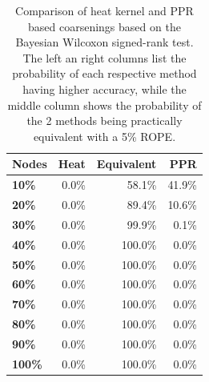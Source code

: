 \begin{table}
  \begin{center}
    \begin{minipage}{180pt} %
      \caption{Comparison of heat kernel and PPR based coarsenings based on the Bayesian Wilcoxon signed-rank test. The left an right columns list the probability of each respective method having higher accuracy, while the middle column shows the probability of the 2 methods being practically equivalent with a 5\% ROPE.}
      \label{tab:bayesian-heat-ppr}
      \begin{tabular}{lrrr}
        \toprule
        \textbf{Nodes} & \textbf{Heat} & \textbf{Equivalent} & \textbf{PPR} \\
        \midrule
        \textbf{10\%}  & 0.0\%         & 58.1\%            & 41.9\%         \\
        \textbf{20\%}  & 0.0\%         & 89.4\%            & 10.6\%         \\
        \textbf{30\%}  & 0.0\%         & 99.9\%            & 0.1\%         \\
        \textbf{40\%}  & 0.0\%         & 100.0\%           & 0.0\%          \\
        \textbf{50\%}  & 0.0\%         & 100.0\%           & 0.0\%          \\
        \textbf{60\%}  & 0.0\%         & 100.0\%           & 0.0\%          \\
        \textbf{70\%}  & 0.0\%         & 100.0\%           & 0.0\%          \\
        \textbf{80\%}  & 0.0\%         & 100.0\%           & 0.0\%          \\
        \textbf{90\%}  & 0.0\%         & 100.0\%           & 0.0\%          \\
        \textbf{100\%} & 0.0\%         & 100.0\%           & 0.0\%          \\
        \bottomrule
      \end{tabular}
    \end{minipage}
  \end{center}
\end{table}
